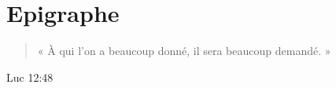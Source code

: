 \chapter*{Epigraphe}

\begin{quote}
« À qui l'on a beaucoup donné, il sera beaucoup demandé. »
\end{quote}

\begin{flushright}
Luc 12:48
\end{flushright}
